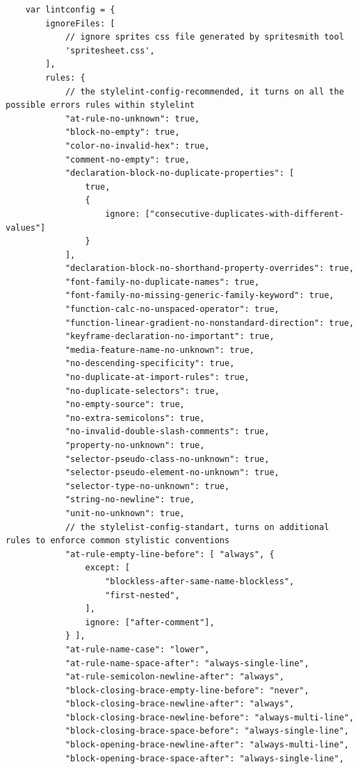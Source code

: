 \begin{small}
\begin{verbatim}
    var lintconfig = {
        ignoreFiles: [
            // ignore sprites css file generated by spritesmith tool
            'spritesheet.css',
        ],
        rules: {
            // the stylelint-config-recommended, it turns on all the possible errors rules within stylelint
            "at-rule-no-unknown": true,
            "block-no-empty": true,
            "color-no-invalid-hex": true,
            "comment-no-empty": true,
            "declaration-block-no-duplicate-properties": [
                true,
                {
                    ignore: ["consecutive-duplicates-with-different-values"]
                }
            ],
            "declaration-block-no-shorthand-property-overrides": true,
            "font-family-no-duplicate-names": true,
            "font-family-no-missing-generic-family-keyword": true,
            "function-calc-no-unspaced-operator": true,
            "function-linear-gradient-no-nonstandard-direction": true,
            "keyframe-declaration-no-important": true,
            "media-feature-name-no-unknown": true,
            "no-descending-specificity": true,
            "no-duplicate-at-import-rules": true,
            "no-duplicate-selectors": true,
            "no-empty-source": true,
            "no-extra-semicolons": true,
            "no-invalid-double-slash-comments": true,
            "property-no-unknown": true,
            "selector-pseudo-class-no-unknown": true,
            "selector-pseudo-element-no-unknown": true,
            "selector-type-no-unknown": true,
            "string-no-newline": true,
            "unit-no-unknown": true,
            // the stylelist-config-standart, turns on additional rules to enforce common stylistic conventions
            "at-rule-empty-line-before": [ "always", {
                except: [
                    "blockless-after-same-name-blockless",
                    "first-nested",
                ],
                ignore: ["after-comment"],
            } ],
            "at-rule-name-case": "lower",
            "at-rule-name-space-after": "always-single-line",
            "at-rule-semicolon-newline-after": "always",
            "block-closing-brace-empty-line-before": "never",
            "block-closing-brace-newline-after": "always",
            "block-closing-brace-newline-before": "always-multi-line",
            "block-closing-brace-space-before": "always-single-line",
            "block-opening-brace-newline-after": "always-multi-line",
            "block-opening-brace-space-after": "always-single-line",

\end{verbatim}
\end{small}
